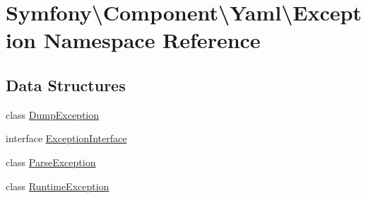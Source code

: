 \hypertarget{namespace_symfony_1_1_component_1_1_yaml_1_1_exception}{}\section{Symfony\textbackslash{}Component\textbackslash{}Yaml\textbackslash{}Exception Namespace Reference}
\label{namespace_symfony_1_1_component_1_1_yaml_1_1_exception}
\subsection*{Data Structures}
\begin{DoxyCompactItemize}
\item 
class \mbox{\hyperlink{class_symfony_1_1_component_1_1_yaml_1_1_exception_1_1_dump_exception}{Dump\+Exception}}
\item 
interface \mbox{\hyperlink{interface_symfony_1_1_component_1_1_yaml_1_1_exception_1_1_exception_interface}{Exception\+Interface}}
\item 
class \mbox{\hyperlink{class_symfony_1_1_component_1_1_yaml_1_1_exception_1_1_parse_exception}{Parse\+Exception}}
\item 
class \mbox{\hyperlink{class_symfony_1_1_component_1_1_yaml_1_1_exception_1_1_runtime_exception}{Runtime\+Exception}}
\end{DoxyCompactItemize}
